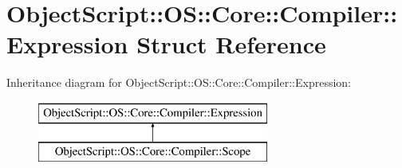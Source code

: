 \hypertarget{struct_object_script_1_1_o_s_1_1_core_1_1_compiler_1_1_expression}{}\section{Object\+Script\+:\+:OS\+:\+:Core\+:\+:Compiler\+:\+:Expression Struct Reference}
\label{struct_object_script_1_1_o_s_1_1_core_1_1_compiler_1_1_expression}
Inheritance diagram for Object\+Script\+:\+:OS\+:\+:Core\+:\+:Compiler\+:\+:Expression\+:\begin{figure}[H]
\begin{center}
\leavevmode
\includegraphics[height=2.000000cm]{struct_object_script_1_1_o_s_1_1_core_1_1_compiler_1_1_expression}
\end{center}
\end{figure}
